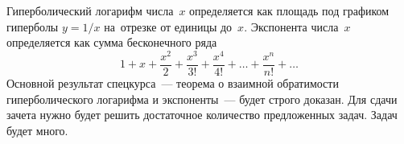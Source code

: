 



Гиперболический логарифм числа~$x$ определяется как площадь под графиком
гиперболы $y = 1 / x$ на~отрезке от единицы до~$x$.
Экспонента числа~$x$ определяется как сумма бесконечного ряда
\[
    1 + x + \frac{x^{2}}{2} + \frac{x^{3}}{3!} + \frac{x^{4}}{4!} + \ldots +
    \frac{x^{n}}{n!} + \ldots
\]
Основной результат спецкурса~--- теорема о взаимной обратимости
гиперболического логарифма и экспоненты~--- будет строго доказан.
Для сдачи зачета нужно будет решить достаточное количество предложенных задач.
Задач будет много.

